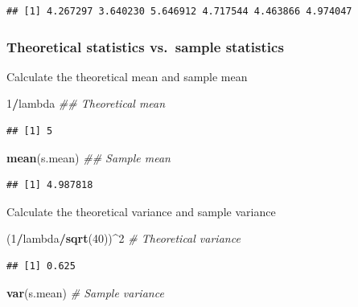 \documentclass[]{article}
\newenvironment{Shaded}{\begin{snugshade}}{\end{snugshade}}
\newcommand{\CommentTok}[1]{\textcolor[rgb]{0.56,0.35,0.01}{\textit{#1}}}
\newcommand{\DecValTok}[1]{\textcolor[rgb]{0.00,0.00,0.81}{#1}}
\newcommand{\KeywordTok}[1]{\textcolor[rgb]{0.13,0.29,0.53}{\textbf{#1}}}
\newcommand{\NormalTok}[1]{#1}
\newcommand{\OperatorTok}[1]{\textcolor[rgb]{0.81,0.36,0.00}{\textbf{#1}}}
\begin{document}
\begin{verbatim}
## [1] 4.267297 3.640230 5.646912 4.717544 4.463866 4.974047
\end{verbatim}

\hypertarget{theoretical-statistics-vs.sample-statistics}{%
\subsubsection{Theoretical statistics vs.~sample
statistics}\label{theoretical-statistics-vs.sample-statistics}}

Calculate the theoretical mean and sample mean

\begin{Shaded}
\begin{Highlighting}[]
\DecValTok{1}\OperatorTok{/}\NormalTok{lambda }\CommentTok{## Theoretical mean}
\end{Highlighting}
\end{Shaded}

\begin{verbatim}
## [1] 5
\end{verbatim}

\begin{Shaded}
\begin{Highlighting}[]
\KeywordTok{mean}\NormalTok{(s.mean) }\CommentTok{## Sample mean}
\end{Highlighting}
\end{Shaded}

\begin{verbatim}
## [1] 4.987818
\end{verbatim}

Calculate the theoretical variance and sample variance

\begin{Shaded}
\begin{Highlighting}[]
\NormalTok{(}\DecValTok{1}\OperatorTok{/}\NormalTok{lambda}\OperatorTok{/}\KeywordTok{sqrt}\NormalTok{(}\DecValTok{40}\NormalTok{))}\OperatorTok{^}\DecValTok{2} \CommentTok{# Theoretical variance}
\end{Highlighting}
\end{Shaded}

\begin{verbatim}
## [1] 0.625
\end{verbatim}

\begin{Shaded}
\begin{Highlighting}[]
\KeywordTok{var}\NormalTok{(s.mean) }\CommentTok{# Sample variance}
\end{Highlighting}
\end{Shaded}
\end{document}
